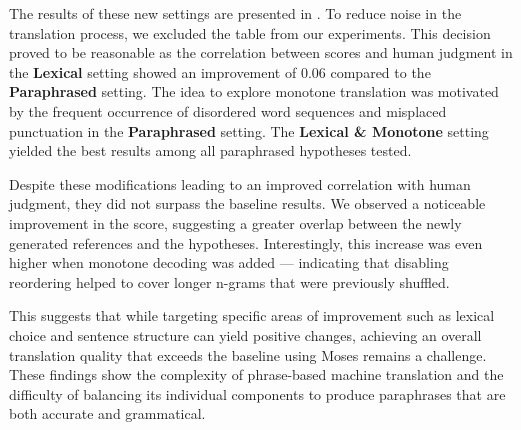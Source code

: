 The results of these new settings are presented in . To reduce noise in the translation process, we excluded the \enhanedmeteor table from our experiments. This decision proved to be reasonable as the correlation between \bleu scores and human judgment in the \textbf{Lexical} setting showed an improvement of 0.06 compared to the \textbf{Paraphrased} setting. The idea to explore monotone translation 
was motivated by the frequent occurrence of disordered word sequences and misplaced punctuation in the \textbf{Paraphrased} setting. The \textbf{Lexical \& Monotone} setting yielded the best results among all paraphrased hypotheses tested.

Despite these modifications leading to an improved correlation with human judgment, they did not surpass the baseline results. We observed a noticeable improvement in the \bleu score, suggesting a greater overlap between the newly generated references and the hypotheses. Interestingly, this increase was even higher when  monotone decoding was added --- indicating that disabling reordering helped to cover longer n-grams that were previously 
shuffled. 

This suggests that while targeting specific areas of improvement such as lexical choice and sentence structure can yield positive changes, achieving an overall translation quality that exceeds the baseline using Moses remains a challenge. These findings show the complexity of phrase-based machine translation and the difficulty of balancing its individual components to produce paraphrases that are both accurate and grammatical.


